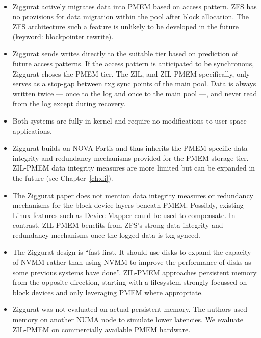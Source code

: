 \documentclass[12pt,a4paper,twoside]{book}
\begin{document}
\begin{itemize}[noitemsep,beginpenalty=100000,midpenalty=100000]
    \item Ziggurat actively migrates data into PMEM based on access pattern.
          ZFS has no provisions for data migration within the pool after block allocation.
          The ZFS architecture such a feature is unlikely to be developed in the future (keyword: blockpointer rewrite).
    \item Ziggurat sends writes directly to the suitable tier based on prediction of future access patterns.
          If the access pattern is anticipated to be synchronous, Ziggurat choses the PMEM tier.
          The ZIL, and ZIL-PMEM specifically, only serves as a stop-gap between txg sync points of the main pool.
          Data is always written twice --- once to the log and once to the main pool ---, and never read from the log except during recovery.
    \item Both systems are fully in-kernel and require no modifications to user-space applications.
    \item Ziggurat builds on NOVA-Fortis and thus inherits the PMEM-specific data integrity and redundancy mechanisms provided for the PMEM storage tier.
          ZIL-PMEM data integrity measures are more limited but can be expanded in the future (see Chapter~\ref{ch:di}).
    \item The Ziggurat paper does not mention data integrity measures or redundancy mechanisms for the block device layers beneath PMEM.
          Possibly, existing Linux features such as Device Mapper could be used to compensate.
          In contrast, ZIL-PMEM benefits from ZFS’s strong data integrity and redundancy mechanisms once the logged data is txg synced.
    \item The Ziggurat design is “fast-first. It should use disks to expand the capacity of NVMM rather than using NVMM to improve the performance of disks as some previous systems have done”.
          ZIL-PMEM approaches persistent memory from the opposite direction, starting with a filesystem strongly focussed on block devices and only leveraging PMEM where appropriate.
    \item Ziggurat was not evaluated on actual persistent memory. The authors used memory on another NUMA node to simulate lower latencies.
          We evaluate ZIL-PMEM on commercially available PMEM hardware.
\end{itemize}
\end{document}
